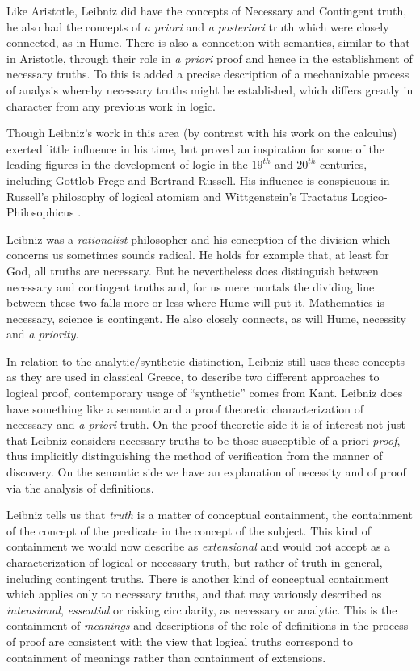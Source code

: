 Like Aristotle, Leibniz did have the concepts of Necessary and Contingent truth, he also had the concepts of \emph{a priori} and \emph{a posteriori} truth which were closely connected, as in Hume.
There is also a connection with semantics, similar to that in Aristotle, through their role in \emph{a priori} proof and hence in the establishment of necessary truths.
To this is added a precise description of a mechanizable process of analysis whereby necessary truths might be established, which differs greatly in character from any previous work in logic.

Though Leibniz's work in this area (by contrast with his work on the calculus) exerted little influence in his time, but proved an inspiration for some of the leading figures in the development of logic in the $19^{th}$ and $20^{th}$ centuries, including Gottlob Frege and Bertrand Russell.
His influence is conspicuous in Russell's philosophy of logical atomism\cite{russell18} and Wittgenstein's Tractatus Logico-Philosophicus \cite{wittgenstein21}.

Leibniz was a \emph{rationalist} philosopher and his conception of the division which concerns us sometimes sounds radical.
He holds for example that, at least for God, all truths are necessary.
But he nevertheless does distinguish between necessary and contingent truths and, for us mere mortals the dividing line between these two falls more or less where Hume will put it.
Mathematics is necessary, science is contingent.
He also closely connects, as will Hume, necessity and \emph{a priority}.

In relation to the analytic/\-synthetic distinction, Leibniz still uses these concepts as they are used in classical Greece, to describe two different approaches to logical proof, contemporary usage of ``synthetic'' comes from Kant.
Leibniz does have something like a semantic and a proof theoretic characterization of necessary and \emph{a priori} truth.
On the proof theoretic side it is of interest not just that Leibniz considers necessary truths to be those susceptible of a priori \emph{proof}, thus implicitly distinguishing the method of verification from the manner of discovery. 
On the semantic side we have an explanation of necessity and of proof via the analysis of definitions.

Leibniz tells us that \emph{truth} is a matter of conceptual containment, the containment of the concept of the predicate in the concept of the subject.
This kind of containment we would now describe as \emph{extensional} and would not accept as a characterization of logical or necessary truth, but rather of truth in general, including contingent truths.
There is another kind of conceptual containment which applies only to necessary truths, and that may variously described as \emph{intensional}, \emph{essential} or risking circularity, as necessary or analytic.
This is the containment of \emph{meanings} and descriptions of the role of definitions in the process of proof are consistent with the view that logical truths correspond to containment of meanings rather than containment of extensions.

